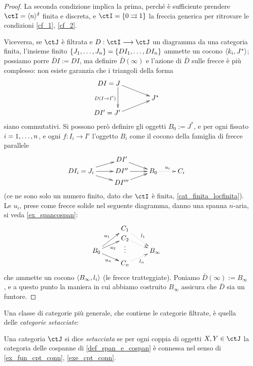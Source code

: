 \begin{proof}
	La seconda condizione implica la prima, perché è sufficiente prendere \(\ctI=\bkt{n}^\delta\) finita e discreta, e \(\ctI=\{0\toto 1\}\) la freccia generica per ritrovare le condizioni \ref{cf_1}, \ref{cf_2}.

	Viceversa, se \(\ctJ\) è filtrata e \(D : \ctI \fun\ctJ\) un diagramma da una categoria finita, l'insieme finito \(\{\tup Jn,\}=\{DI_1,\dots, DI_n\}\) ammette un cocono \(\langle k_i,J^*\rangle\); possiamo porre \(\bar D I := DI\), ma definire \(\bar D (\infty)\) e l'azione di \(\bar D\) sulle frecce è più complesso: non esiste garanzia che i triangoli della forma
	\[\xymatrix@R=3mm{
		**[l] DI=J\ar[dr]\ar[dd]_{D(I\to I')} \\
		&J^* \\
		**[l] DI'=J'\ar[ur]
		}\]
	siano commutativi. Si possono però definire gli oggetti \(B_0 := J^*\), e per ogni fissato \(i=\iter n\), e ogni \(f : I_i \to I'\) l'oggetto \(B_i\) come il cocono della famiglia di frecce parallele
	\[\xymatrix@R=1mm{
		&DI'\ar[dr]&\\
		DI_i = J_i\ar[ur]\ar[r]\ar[dr]& DI''\ar[r]& B_0 \ar@{.>}[r]^-{u_i} & C_i\\
		&DI'''\ar[ur]&
		}\]
	(ce ne sono solo un numero finito, dato che \(\ctI\) è finita, \ref{cat_finita_locfinita}). Le \(u_i\), prese come frecce solide nel seguente diagramma, danno una spanna \(n\)-aria, si veda \ref{ex_spancospan}:
	\[\xymatrix@R=0mm{
		& C_1\ar@{.>}[ddr]^{l_1}\\
		& C_2\ar@{.>}[dr]\\
		B_0 \ar[uur]^-{u_1}\ar[ur]_{u_2}\ar[dr]_-{u_n} & \vdots & B_\infty\\
		& C_n\ar@{.>}[ur]_{l_n}
		}\]
	che ammette un cocono \(\langle B_\infty,l_i\rangle\) (le frecce tratteggiate). Poniamo \(\bar D(\infty) := B_\infty\), e a questo punto la maniera in cui abbiamo costruito \(B_\infty\) assicura che \(\bar D\) sia un funtore.
\end{proof}
Una classe di categorie più generale, che contiene le categorie filtrate, è quella delle \emph{categorie setacciate}:
\begin{definition}\label{def_cat_setacciata}
	Una categoria \(\ctJ\) si dice \emph{setacciata} se per ogni coppia di oggetti \(X,Y\in\ctJ\) la categoria delle cospanne di \ref{def_span_e_cospan} è connessa nel senso di \ref{ex_fun_cpt_conn}, \ref{exe_cpt_conn}.
\end{definition}
